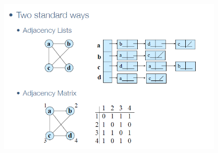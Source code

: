 \begin{figure}[h]
    \centering
    \includegraphics[width=0.75\linewidth]{graph representation.png}
    \caption{}
    \label{fig:enter-label}
\end{figure}

